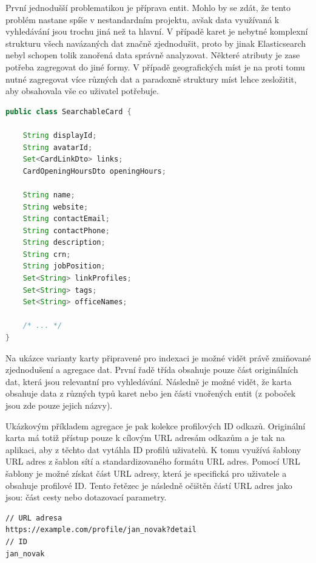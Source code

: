 		První jednodušší problematikou je příprava entit.
		Mohlo by se zdát, že tento problém nastane spíše v nestandardním projektu, avšak data využívaná k vyhledávání
		jsou trochu jiná než ta hlavní.
		V případě karet je nebytné komplexní strukturu všech navázaných dat značně zjednodušit, proto by jinak Elasticsearch
		nebyl schopen tolik zanořená data správně analyzovat.
		Některé atributy je zase potřeba zagregovat do jiné formy.
		V případě geografických míst je na proti tomu nutné zagregovat více různých dat a paradoxně struktury míst lehce
		zesložitit, aby obsahovala vše co uživatel potřebuje.

		\begin{lstlisting}[language=Java, caption={Ukázka indexovatelné varianty karty. Obsahuje metadata a vyhledatelné data. Zdroj: [autor]}]
public class SearchableCard {

    String displayId;
    String avatarId;
    Set<CardLinkDto> links;
    CardOpeningHoursDto openingHours;

    String name;
    String website;
    String contactEmail;
    String contactPhone;
    String description;
    String crn;
    String jobPosition;
    Set<String> linkProfiles;
    Set<String> tags;
    Set<String> officeNames;

    /* ... */
}
		\end{lstlisting}

		Na ukázce varianty karty připravené pro indexaci je možné vidět právě zmiňované zjednodušení a agregace dat.
		První řadě třída obsahuje pouze část originálních dat, která jsou relevantní pro vyhledávání.
		Následně je možné vidět, že karta obsahuje data z různých typů karet nebo jen části vnořených entit (z poboček jsou
		zde pouze jejich názvy).

		Ukázkovým příkladem agregace je pak kolekce profilových ID odkazů.
		Originální karta má totiž přístup pouze k cílovým \ac{URL} adresám odkazům a je tak na aplikaci, aby z těchto dat
		vytáhla ID profilů uživatelů.
		K tomu využívá šablony \ac{URL} adres z šablon sítí a standardizovaného formátu \ac{URL} adres.
		Pomocí \ac{URL} šablony je možné získat část \ac{URL} adresy, která je specifická pro uživatele a obsahuje profilové ID.
		Tento řetězec je následně očištěn částí \ac{URL} adres jako jsou: část cesty nebo dotazovací parametry.

		\begin{lstlisting}[caption={Ukázka transformace URL adresy na profilové ID. Zdroj: [autor]}]
// URL adresa
https://example.com/profile/jan_novak?detail
// ID
jan_novak
		\end{lstlisting}

